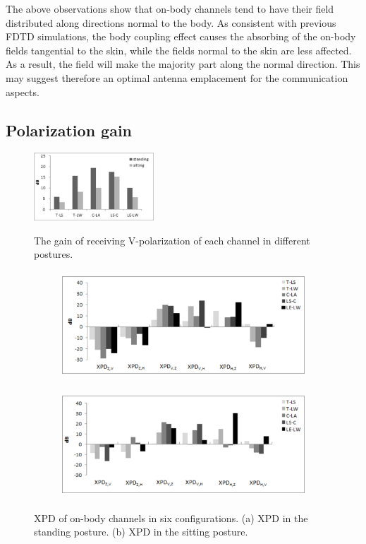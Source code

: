 \documentclass[conference]{IEEEtran}
\begin{document}
The above observations show that on-body channels tend to have their field distributed along directions normal to the body. As consistent with previous FDTD simulations, the body coupling effect causes the absorbing of the on-body fields tangential to the skin, while the fields normal to the skin are less affected. As a result, the field will make the majority part along the normal direction. This may suggest therefore an optimal antenna emplacement for the communication aspects.

\subsection{Polarization gain}
\begin{figure}[!t]
  \centering
  \includegraphics[width=0.4\textwidth]{figs/2.eps}\\
  \caption{The gain of receiving V-polarization of each channel in different postures.}
  \label{fig:2}
\end{figure}
\begin{figure}[!t]
\centering
\begin{subfigure}[t]{\textwidth}
\centering
\includegraphics[width=14cm,height=4cm]{figs/3a.eps}
\subcaption{}
\label{fig:3a}
\end{subfigure}
\begin{subfigure}[t]{\textwidth}
\centering
\includegraphics[width=14cm,height=4cm]{figs/3b.eps}
\subcaption{}
\label{fig:3b}
\end{subfigure}
\caption{XPD of on-body channels in six configurations. (a) XPD in the standing posture. (b) XPD in the sitting posture.}
\label{fig:3}
\end{figure}
\end{document}
